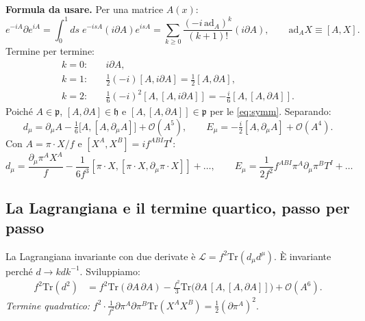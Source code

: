\documentclass[11pt,a4paper]{article}
\numberwithin{equation}{section}
\theoremstyle{remark}
\newcommand{\Tr}{\mathrm{Tr}}
\newcommand{\p}{\mathfrak{p}}
\newcommand{\h}{\mathfrak{h}}
\begin{document}
\textbf{Formula da usare.} Per una matrice $A(x)$:
\begin{equation}
e^{-iA}\partial e^{iA}=\int_0^1\!ds\;e^{-isA}(i\partial A)e^{isA}=\sum_{k\ge0}\frac{(-i\,\mathrm{ad}_A)^k}{(k+1)!}(i\partial A),\qquad \mathrm{ad}_A X\equiv[A,X].
\end{equation}
Termine per termine:
\begin{align*}
k=0:&\quad i\partial A,\\
k=1:&\quad \tfrac12(-i)[A,i\partial A]=\tfrac12[A,\partial A],\\
k=2:&\quad \tfrac16(-i)^2[A,[A,i\partial A]]=-\tfrac{i}{6}[A,[A,\partial A]].
\end{align*}
Poiché $A\in\p$, $[A,\partial A]\in\h$ e $[A,[A,\partial A]]\in\p$ per le \eqref{eq:symm}. Separando:
\begin{equation}
\boxed{\;d_\mu=\partial_\mu A-\tfrac16\big[A,[A,\partial_\mu A]\big]+\mathcal O(A^5),\qquad E_\mu=-\tfrac{i}{2}[A,\partial_\mu A]+\mathcal O(A^4).\;}
\end{equation}
Con $A=\pi\cdot X/f$ e $[X^A,X^B]=if^{ABI}T^I$:
\begin{equation}
d_\mu=\frac{\partial_\mu\pi^AX^A}{f}-\frac{1}{6f^3}[\pi\!\cdot\!X,[\pi\!\cdot\!X,\partial_\mu\pi\!\cdot\!X]]+\dots,\qquad
E_\mu=\frac{1}{2f^2}f^{ABI}\pi^A\partial_\mu\pi^BT^I+\dots
\label{eq:dE}
\end{equation}

\subsection{La Lagrangiana e il termine quartico, passo per passo}

La Lagrangiana invariante con due derivate è $\mathcal L=f^2\Tr(d_\mu d^\mu)$. È invariante perché $d\to kdk^{-1}$. Sviluppiamo:
\begin{align*}
f^2\Tr(d^2)&=f^2\Tr(\partial A\,\partial A)-\frac{f^2}{3}\Tr\big(\partial A\,[A,[A,\partial A]]\big)+\mathcal O(A^6).
\end{align*}
\emph{Termine quadratico:} $f^2\cdot\frac{1}{f^2}\partial\pi^A\partial\pi^B\Tr(X^AX^B)=\frac12(\partial\pi^A)^2$. \checkmark
\end{document}
